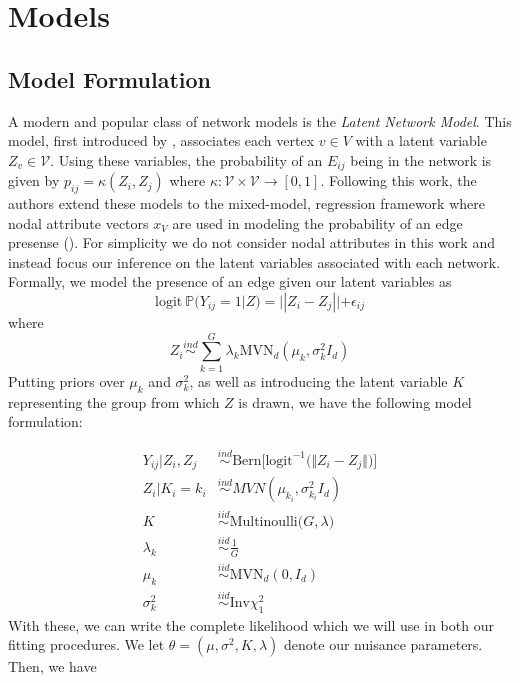 \documentclass{article}
\begin{document}
\section{Models} \label{Models}


\subsection{Model Formulation}\label{Model Formulation}

A modern and popular class of network models is the \textit{Latent Network Model}. This model, first introduced by \cite{Hoff2002}, associates each vertex $v\in V$ with a latent variable $Z_v\in \mathcal{V}$. Using these variables, the probability of an $E_{ij}$ being in the network is given by $p_{ij} = \kappa(Z_i, Z_j)$ where $\kappa:\mathcal{V}\times\mathcal{V}\to[0,1]$. Following this work, the authors extend these models to the mixed-model, regression framework where nodal attribute vectors $x_V$ are used in modeling the probability of an edge presense (\cite{KRIVITSKY2009204}). For simplicity we do not consider nodal attributes in this work and instead focus our inference on the latent variables associated with each network. Formally, we model the presence of an edge given our latent variables as
\[\text{logit} \ \mathbb{P}(Y_{ij} = 1|Z) = ||Z_i - Z_j|| + \epsilon_{ij}\]
where
\[Z_i \overset{ind}{\sim}\sum_{k=1}^G \lambda_k\text{MVN}_d(\mu_k,\sigma_k^2I_d)\]
Putting priors over $\mu_k$ and  $\sigma_k^2$, as well as introducing the latent variable $K$ representing the group from which $Z$ is drawn, we have the following model formulation:

\begin{align*}
Y_{ij} | Z_i, Z_j &\overset{ind}\sim \text{Bern}\Big[\text{logit}^{-1}\big(\Vert Z_i - Z_j \Vert\big)\Big] \\
Z_i | K_i = k_i &\overset{ind}\sim MVN(\mu_{k_i}, \sigma_{k_i}^2 I_d) \\
K &\overset{iid}\sim \text{Multinoulli}\big(G, \lambda \big) \\
\lambda_k &\overset{iid}\sim \frac{1}{G} \\
\mu_k &\overset{iid}\sim \text{MVN}_d(0, I_d) \\
\sigma_k^2 &\overset{iid}\sim \text{Inv} \chi^2_1
\end{align*}
With these, we can write the complete likelihood which we will use in both our fitting procedures. We let $\theta = (\mu, \sigma^2, K, \lambda)$ denote our nuisance parameters. Then, we have
\end{document}
